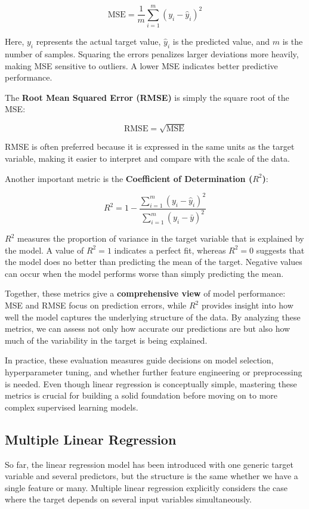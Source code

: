 \[
\text{MSE} = \frac{1}{m} \sum_{i=1}^m (y_i - \hat{y}_i)^2
\]

Here, $y_i$ represents the actual target value, $\hat{y}_i$ is the predicted value, and $m$ is the number of samples. Squaring the errors penalizes larger deviations more heavily, making MSE sensitive to outliers. A lower MSE indicates better predictive performance.

The \textbf{Root Mean Squared Error (RMSE)} is simply the square root of the MSE:

\[
\text{RMSE} = \sqrt{\text{MSE}}
\]

RMSE is often preferred because it is expressed in the same units as the target variable, making it easier to interpret and compare with the scale of the data.

Another important metric is the \textbf{Coefficient of Determination ($R^2$)}:

\[
R^2 = 1 - \frac{\sum_{i=1}^m (y_i - \hat{y}_i)^2}{\sum_{i=1}^m (y_i - \bar{y})^2}
\]

$R^2$ measures the proportion of variance in the target variable that is explained by the model. A value of $R^2 = 1$ indicates a perfect fit, whereas $R^2 = 0$ suggests that the model does no better than predicting the mean of the target. Negative values can occur when the model performs worse than simply predicting the mean.

Together, these metrics give a \textbf{comprehensive view} of model performance: MSE and RMSE focus on prediction errors, while $R^2$ provides insight into how well the model captures the underlying structure of the data. By analyzing these metrics, we can assess not only how accurate our predictions are but also how much of the variability in the target is being explained.

In practice, these evaluation measures guide decisions on model selection, hyperparameter tuning, and whether further feature engineering or preprocessing is needed. Even though linear regression is conceptually simple, mastering these metrics is crucial for building a solid foundation before moving on to more complex supervised learning models.




\subsection{Multiple Linear Regression}

So far, the linear regression model has been introduced with one generic target variable and several predictors, but the structure is the same whether we have a single feature or many. Multiple linear regression explicitly considers the case where the target depends on several input variables simultaneously.

